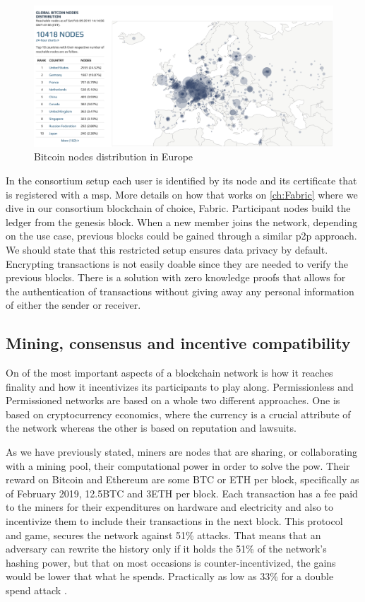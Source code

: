 \begin{figure}[h]
    \centering
    \includegraphics[width=1\textwidth]{images/BTCnodes.png}
    \caption{Bitcoin nodes distribution in Europe \cite{bitnodes}}
    \label{fig:btc-nodes}
\end{figure}

In the consortium setup each user is identified by its node and its certificate that is registered with a \acrfull{msp}. More details on how that works on \ref{ch:Fabric} where we dive in our consortium blockchain of choice, Fabric. Participant nodes build the ledger from the genesis block. When a new member joins the network, depending on the use case, previous blocks could be gained through a similar \acrshort{p2p} approach. We should state that this restricted setup ensures data privacy by default. Encrypting transactions is not easily doable since they are needed to verify the previous blocks. There is a solution with zero knowledge proofs that allows for the authentication of transactions without giving away any personal information of either the sender or receiver\cite{reitwiessner2016zksnarks}.

\subsection{Mining, consensus and incentive compatibility} 
On of the most important aspects of a blockchain network is how it reaches finality and how it incentivizes its participants to play along. Permissionless and Permissioned networks are based on a whole two different approaches. One is based on cryptocurrency economics\cite{schrijvers2016incentive}, where the currency is a crucial attribute of the network whereas the other is based on reputation and lawsuits.

As we have previously stated, miners are nodes that are sharing, or collaborating with a mining pool, their computational power in order to solve the \gls{pow}. Their reward on Bitcoin and Ethereum are some BTC or ETH per block, specifically as of February 2019, 12.5BTC and 3ETH per block. Each transaction has a fee paid to the miners for their expenditures on hardware and electricity and also to incentivize them to include their transactions in the next block. This protocol and game, secures the network against 51\% attacks. That means that an adversary can rewrite the history only if it holds the 51\% of the network's hashing power, but that on most occasions is counter-incentivized, the gains would be lower that what he spends. Practically as low as 33\% for a double spend attack \cite{eyal2018majority}.

